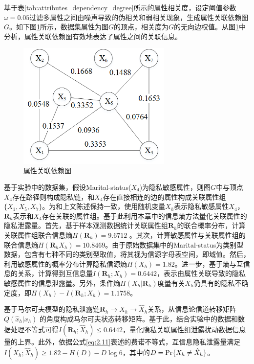 基于表\ref{tab:attributes_dependency_degree}所示的属性相关度，设定阈值参数$\omega=0.05$过滤多属性之间由噪声导致的伪相关和弱相关现象，生成属性关联依赖图$G$。如下图\ref{Fig:attributes_dependence_graph}所示，数据集属性为图$G$的顶点，相关度为$G$的无向边权值。从图\ref{Fig:attributes_dependence_graph}中分析，属性关联依赖图有效地表达了属性之间的关联信息。
\begin{figure}[htbp]
	\centering
	\includegraphics[width=3.0in]{./figures/chapter03/Figure1.png}
	\caption{属性关联依赖图}
	\label{Fig:attributes_dependence_graph}
\end{figure}

基于实验中的数据集，假设Marital-status($X_4$)为隐私敏感属性，则图$G$中与顶点$X_4$存在路径则构成隐私链，和$X_4$存在直接相连的边的属性构成关联属性组$\{X_1,X_5,X_7\}$。为和上文陈述保持一致，使用随机变量$X_h$表示隐私敏感属性$X_4$，$\bm{R}_h$表示和$X_4$存在关联的属性组。基于此利用本章中的信息熵方法量化关联属性的隐私泄露量。首先，基于样本观测数据统计关联属性组$\bm{R}_h$的联合概率分布，计算关联属性组联合信息熵$H(\bm{R}_h)=9.6712$ 。其次，计算敏感属性与关联属性组的联合信息熵$H(\bm{R}_hX_h) =10.8469$。由于原始数据集中的Marital-status为类别型数据，包含有七种不同的类别型取值，将其视为信源字母表空间，即域值。然后，利用敏感属性的概率分布计算隐私信源熵$H(X_h)=1.82$。进一步，基于熵与互信息的关系，计算得到互信息量$I(\bm{R}_h;X_h)=0.6442$，表示由属性关联导致的隐私敏感属性的信息泄露量。另外，条件熵$H(X_h|\bm{R}_h)$度量有关$X_h$仍具有的隐私不确定度，即$H(X_h)-I(\bm{R}_h;X_h)=1.1758$。

基于马尔可夫模型的隐私泄露链$\bm{R}_{h}\rightarrow X_{h}\rightarrow\hat{X}_{h}$关系，从信息论信道转移矩阵$Q(\hat{x}_h|x_h)$ 的角度构成马尔可夫状态转移矩阵。基于此，结合实验中的数据和数据处理不等式可得$I(\bm{R}_h;\hat{X}_h) \leq 0.6442$，量化隐私关联属性组泄露扰动数据信息量的上界。此外，依据公式\ref{eq:2.11}表述的费诺不等式，互信息隐私泄露量满足$I(X_h;\hat{X}_h)\geq 1.82-H(D)-D\log 6$，其中的$D={\rm Pr}\{X_h \neq \hat{X}_h\}$。


